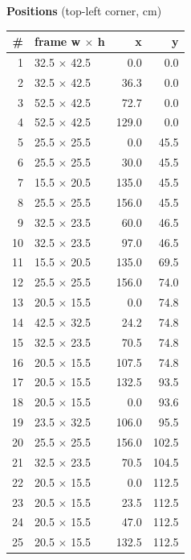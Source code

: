 \documentclass[a4paper,landscape,10pt]{article}
\begin{document}
\begin{minipage}[t]{0.25\textwidth}
\vspace{8pt}
{\bfseries Positions} (top-left corner, cm)\\[2pt]
\tiny
\begin{tabular}{@{}r l r r@{}}
\toprule
\# & frame w $\times$ h & x & y \\
\midrule
1 & 32.5 $\times$ 42.5 & 0.0 & 0.0 \\
2 & 32.5 $\times$ 42.5 & 36.3 & 0.0 \\
3 & 52.5 $\times$ 42.5 & 72.7 & 0.0 \\
4 & 52.5 $\times$ 42.5 & 129.0 & 0.0 \\
5 & 25.5 $\times$ 25.5 & 0.0 & 45.5 \\
6 & 25.5 $\times$ 25.5 & 30.0 & 45.5 \\
7 & 15.5 $\times$ 20.5 & 135.0 & 45.5 \\
8 & 25.5 $\times$ 25.5 & 156.0 & 45.5 \\
9 & 32.5 $\times$ 23.5 & 60.0 & 46.5 \\
10 & 32.5 $\times$ 23.5 & 97.0 & 46.5 \\
11 & 15.5 $\times$ 20.5 & 135.0 & 69.5 \\
12 & 25.5 $\times$ 25.5 & 156.0 & 74.0 \\
13 & 20.5 $\times$ 15.5 & 0.0 & 74.8 \\
14 & 42.5 $\times$ 32.5 & 24.2 & 74.8 \\
15 & 32.5 $\times$ 23.5 & 70.5 & 74.8 \\
16 & 20.5 $\times$ 15.5 & 107.5 & 74.8 \\
17 & 20.5 $\times$ 15.5 & 132.5 & 93.5 \\
18 & 20.5 $\times$ 15.5 & 0.0 & 93.6 \\
19 & 23.5 $\times$ 32.5 & 106.0 & 95.5 \\
20 & 25.5 $\times$ 25.5 & 156.0 & 102.5 \\
21 & 32.5 $\times$ 23.5 & 70.5 & 104.5 \\
22 & 20.5 $\times$ 15.5 & 0.0 & 112.5 \\
23 & 20.5 $\times$ 15.5 & 23.5 & 112.5 \\
24 & 20.5 $\times$ 15.5 & 47.0 & 112.5 \\
25 & 20.5 $\times$ 15.5 & 132.5 & 112.5 \\
\bottomrule
\end{tabular}
\end{minipage}
\clearpage
\end{document}
